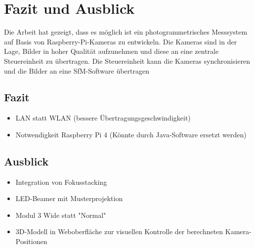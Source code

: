 \documentclass[./00PhotoBox.tex]{subfiles}
\begin{document}
\chapter{Fazit und Ausblick}

Die Arbeit hat gezeigt, dass es möglich ist ein photogrammetrisches Messsystem auf Basis von Raspberry-Pi-Kameras zu entwickeln. Die Kameras sind in der Lage, Bilder in hoher Qualität aufzunehmen und diese an eine zentrale Steuereinheit zu übertragen. Die Steuereinheit kann die Kameras synchronisieren und die Bilder an eine \gls{SfM}-Software übertragen

\section{Fazit}
\begin{itemize}
    \item LAN statt WLAN (bessere Übertragungsgeschwindigkeit)
    \item Notwendigkeit Raspberry Pi 4 (Könnte durch Java-Software ersetzt werden)
\end{itemize}

\section{Ausblick}
\label{s:ausblick}
\begin{itemize}
    \item Integration von Fokusstacking
    \item LED-Beamer mit Musterprojektion
    \item Modul 3 Wide statt "Normal"
    \item 3D-Modell in Weboberfläche zur visuellen Kontrolle der berechneten Kamera-Positionen
\end{itemize}

\biblio
\end{document}
